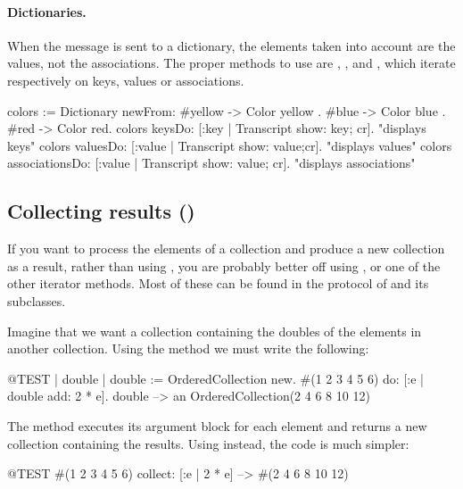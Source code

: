 \documentclass[a4paper,10pt,twoside]{book}
\begin{document}


\paragraph{Dictionaries.}
When the message  is sent to a dictionary, the elements taken into account are the values, not the associations. The proper methods to use are , , and , which iterate respectively on keys, values or associations.

\begin{code}{}
colors := Dictionary newFrom: {#yellow -> Color yellow . #blue -> Color blue . #red -> Color red}.
colors keysDo: [:key | Transcript show: key; cr].                    "displays keys"
colors valuesDo: [:value | Transcript show: value;cr].            "displays values"
colors associationsDo: [:value | Transcript show: value; cr].  "displays associations"
\end{code}

\subsection{Collecting results ()}
If you want to process the elements of a collection and produce a new collection as a result, rather than using , you are probably better off using , or one of the other iterator methods.
Most of these can be found in the  protocol of  and its subclasses.

Imagine that we want a collection containing the doubles of the elements in another collection.
Using the method  we must write the following:

\begin{code}{@TEST | double |}
double := OrderedCollection new.
#(1 2 3 4 5 6) do: [:e | double add: 2 * e].
double --> an OrderedCollection(2 4 6 8 10 12)
\end{code}

\noindent
The method  executes its argument block for each element and returns a new collection containing the results.
Using  instead, the code is much simpler:
\begin{code}{@TEST}
#(1 2 3 4 5 6) collect: [:e | 2 * e] --> #(2 4 6 8 10 12)
\end{code}
\end{document}
